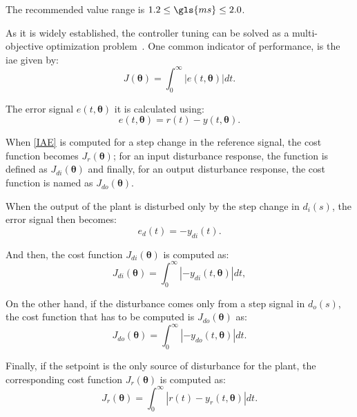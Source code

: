 The recommended value range is  $1.2\leq \gls{ms} \leq 2.0$.

As it is widely established, the controller tuning can be solved as a multi-objective optimization problem~\citep{Gambier2007}. One common indicator of performance, is the \gls{iae} given by:
%
\begin{equation}  %
J(\bm{\theta})=\int_0^\infty \left |{e(t,\bm{\theta})}\right | dt.
\label{IAE}
\end{equation}

The error signal $e(t, \bm{\theta})$ it is calculated using:
%
\begin{equation}  %
e(t,\bm{\theta})=r(t)-y(t,\bm{\theta}).
\label{error}
\end{equation}

When \eqref{IAE} is computed for a step change in the reference signal, the cost function becomes $J_r(\bm{\theta})$; for an input disturbance response, the function is defined as $J_{di}(\bm{\theta})$ and finally, for an output disturbance response, the cost function is named as $J_{do}(\bm{\theta})$.

When the output of the plant is disturbed only by the step change in $d_i(s)$, the error signal then becomes:
\begin{equation}  %
e_d(t)=-y_{di}(t)
\label{per}.
\end{equation}

And then, the cost function $J_{di}(\bm{\theta})$ is computed as:
\begin{equation}  %
J_{di}(\bm{\theta})= \int_0^\infty  \left |-{y_{di}(t,\bm{\theta})}\right | dt,
\label{perin}
\end{equation}

On the other hand, if the disturbance comes only from a step signal in $d_o(s)$, the cost function that has to be computed is $J_{do}(\bm{\theta})$ as:
%
\begin{equation}  %
J_{do}(\bm{\theta})= \int_0^\infty  \left |-{y_{do}(t,\bm{\theta})}\right | dt.
\label{perout}
\end{equation}	
%

Finally, if the setpoint is the only source of disturbance for the plant, the corresponding cost function $J_r(\bm{\theta})$ is computed as:
\begin{equation}  %
J_r(\bm{\theta})=\int_0^\infty \left |r(t)-y_r(t,\bm{\theta})\right | dt.
\label{eq:Jr}
\end{equation}
%

